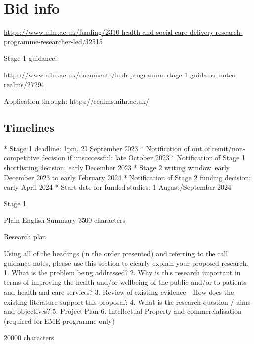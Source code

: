 \section{Bid info}

\url{https://www.nihr.ac.uk/funding/2310-health-and-social-care-delivery-research-programme-researcher-led/32515}

Stage 1 guidance:

\url{https://www.nihr.ac.uk/documents/hsdr-programme-stage-1-guidance-notes-realms/27294}

Application through: https://realms.nihr.ac.uk/



\subsection{Timelines}

\begin{markdown}
* Stage 1 deadline: 1pm, 20 September 2023
* Notification of out of remit/non-competitive decision if unsuccessful: late October 2023
* Notification of Stage 1 shortlisting decision: early December 2023
* Stage 2 writing window: early December 2023 to early February 2024
* Notification of Stage 2 funding decision: early April 2024
* Start date for funded studies: 1 August/September 2024
\end{markdown}

Stage 1

Plain English Summary 3500 characters

Research plan

Using all of the headings (in the order presented) and referring to the call guidance notes, please use this section to clearly explain your proposed research.
1. What is the problem being addressed?
2. Why is this research important in terms of improving the health and/or wellbeing of the public and/or to patients and health and care services?
3. Review of existing evidence - How does the existing literature support this proposal?
4. What is the research question / aims and objectives?
5. Project Plan
6. Intellectual Property and commercialisation (required for EME programme only)

20000 characters
